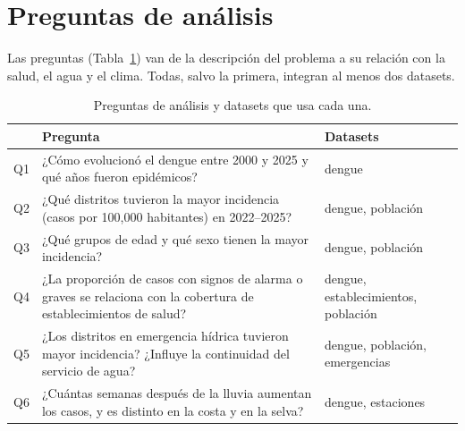 \section{Preguntas de análisis}
\label{sec:questions}

Las preguntas (Tabla~\ref{tab:questions}) van de la descripción del problema a su relación con la salud, el
agua y el clima. Todas, salvo la primera, integran al menos dos datasets.

\begin{table}[htbp]
\centering
\caption{Preguntas de análisis y datasets que usa cada una.}
\label{tab:questions}
\small
\begin{tabularx}{\textwidth}{@{}l X >{\raggedright\arraybackslash}p{3.8cm}@{}}
\toprule
 & Pregunta & Datasets \\
\midrule
Q1 & ¿Cómo evolucionó el dengue entre 2000 y 2025 y qué años fueron epidémicos? & dengue \\
Q2 & ¿Qué distritos tuvieron la mayor incidencia (casos por 100,000 habitantes) en 2022–2025? & dengue, población \\
Q3 & ¿Qué grupos de edad y qué sexo tienen la mayor incidencia? & dengue, población \\
Q4 & ¿La proporción de casos con signos de alarma o graves se relaciona con la cobertura de establecimientos de
     salud? & dengue, establecimientos, población \\
Q5 & ¿Los distritos en emergencia hídrica tuvieron mayor incidencia? ¿Influye la continuidad del servicio de
     agua? & dengue, población, emergencias \\
Q6 & ¿Cuántas semanas después de la lluvia aumentan los casos, y es distinto en la costa y en la selva? &
     dengue, estaciones \\
\bottomrule
\end{tabularx}
\end{table}
